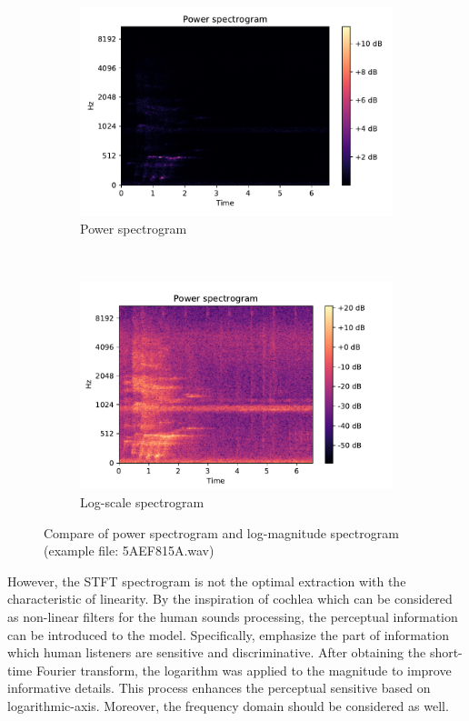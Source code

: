 \begin{figure}[htp]
     \begin{subfigure}[b]{0.5\linewidth}
         \centering
		  \includegraphics[scale=0.5]{Figs/chap3/power.pdf}
		  \caption{Power spectrogram}
     \end{subfigure}
     ~
     \begin{subfigure}[b]{0.5\linewidth}
         \centering
		  \includegraphics[scale=0.5]{Figs/chap3/logpower.pdf}
		  \caption{Log-scale spectrogram}
     \end{subfigure}
     \caption{Compare of power spectrogram and log-magnitude spectrogram (example file: 5AEF815A.wav)}
     \label{fig:powerlog}
\end{figure}
However, the STFT spectrogram is not the optimal extraction with the characteristic of linearity. By the inspiration of cochlea which can be considered as non-linear filters for the human sounds processing, the perceptual information can be introduced to the model. Specifically, emphasize the part of information which human listeners are sensitive and discriminative. After obtaining the short-time Fourier transform, the logarithm was applied to the magnitude to improve informative details. This process enhances the perceptual sensitive based on logarithmic-axis. Moreover, the frequency domain should be considered as well.

